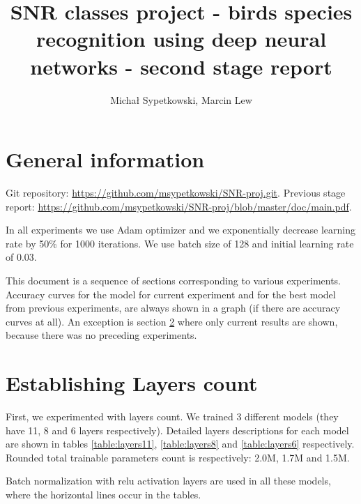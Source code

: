 \documentclass[a4paper]{article}
\begin{document}
\title{SNR classes project - birds species recognition using deep neural networks
- second stage report}

\author{Michał Sypetkowski, Marcin Lew}
\twocolumn
\maketitle


\section{General information}
Git repository:\newline
\url{https://github.com/msypetkowski/SNR-proj.git}.\newline
Previous stage report: \newline
\url{https://github.com/msypetkowski/SNR-proj/blob/master/doc/main.pdf}.

In all experiments we use Adam optimizer and we exponentially
decrease learning rate by 50\% for 1000 iterations.
We use batch size of 128 and initial learning rate of 0.03.

This document is a sequence of sections corresponding to various experiments. 
Accuracy curves for the model for current experiment and for the best model from previous experiments,
are always shown in a graph (if there are accuracy curves at all).
An exception is section \ref{expLayer} where only current results are shown, because there was no preceding experiments.

\section{Establishing Layers count}
\label{expLayer}

First, we experimented with layers count.
    We trained 3 different models (they have 11, 8 and 6 layers respectively).
Detailed layers descriptions for each model are shown in tables
\ref{table:layers11},
\ref{table:layers8} and
\ref{table:layers6} respectively.
Rounded total trainable parameters count is respectively: 2.0M, 1.7M  and 1.5M.

Batch normalization with relu activation layers are used in all these models,
where the horizontal lines occur in the tables.
\end{document}
